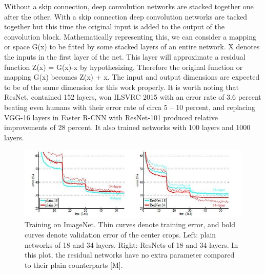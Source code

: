 Without a skip connection, deep convolution networks are stacked together one after the other.  With a skip connection deep convolution networks are tacked together but this time the original input is added to the output of the convolution block.
Mathematically representing this, we can consider a mapping or space G(x) to be fitted by some stacked layers of an entire network.  X denotes the inputs in the first layer of the net. This layer will approximate a residual function Z(x) = G(x)-x by hypothesizing.  Therefore the original function or mapping G(x) becomes Z(x) + x.  The input and output dimensions are expected to be of the same dimension for this work properly.  It is worth noting that ResNet, contained 152 layers, won ILSVRC 2015 with an error rate of 3.6 percent beating even humans with their error rate of circa 5 – 10 percent, and replacing VGG-16 layers in Faster R-CNN with ResNet-101 produced relative improvements of 28 percent. It also trained networks with 100 layers and 1000 layers. 

\begin{figure}
\centering
  \includegraphics[width=0.7\linewidth]{images/resnet-graph.jpg}
   \caption{Training on ImageNet. Thin curves denote training error, and bold curves denote validation error of the center crops. Left: plain networks of 18 and 34 layers. Right: ResNets of 18 and 34 layers. In this plot, the residual networks have no extra parameter compared to their plain counterparts [M].}
\end{figure}

